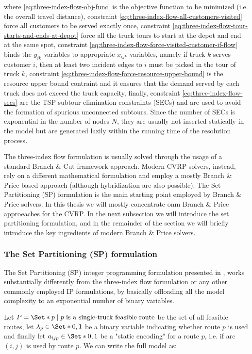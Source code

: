 where \ref{eq:three-index-flow-obj-func} is the objective function to be minimized (i.e. the overall travel distance),
constraint \ref{eq:three-index-flow-all-customers-visited} force all customers to be served exactly once,
constraint \ref{eq:three-index-flow-tour-starts-and-ends-at-depot} force all the truck tours to start at the depot and end at the same spot,
constraint \ref{eq:three-index-flow-force-visited-customer-if-flow} binds the $y_{ik}$ variables to appropriate $x_{ijk}$ variables,
namely if truck $k$ serves customer $i$, then at least two incident edges to $i$ must be picked in the tour of truck $k$,
constraint \ref{eq:three-index-flow-force-resource-upper-bound} is the resource upper bound contraint and it ensures that the demand served by each truck does not exceed the truck capacity,
finally, constraint \ref{eq:three-index-flow-secs} are the TSP subtour elimination constraints (SECs) and are used to avoid the formation of spurious unconnected subtours.
Since the number of SECs is exponential in the number of nodes $N$, they are usually not inserted statically in the model but are generated lazily within the running time of the resolution process.

The three-index flow formulation is usually solved through the usage of a standard Branch \& Cut framework approach.
Modern CVRP solvers, instead, rely on a different mathematical formulation and employ a  mostly Branch \& Price based-approach (although hybridization are also possible).
The Set Partitioning (SP) formulation is the main starting point employed by Branch \& Price solvers.
In this thesis we will mostly concentrate onm Branch \& Price approeaches for the CVRP.
In the next subsection we will introduce the set partitioning formulation, and in the remainder of the section
we will briefly introduce the key ingredients of modern Branch \& Price solvers.

\subsubsection{The Set Partitioning (SP) formulation}
The Set Partitioning (SP) integer programming formulation presented in \textcite{balinski1964integer},
works substantially differently from the three-index flow formulation or any other commonly employed
IP formulations, by basically offloading all the model complexity to an exponential number of binary variables.

Let $P = \Set*{p \mid p\ \text{is a single-truck feasible route}}$ be the set of all feasible routes,
let $\lambda_p \in \Set*{0, 1}$ be a binary variable indicating whether route $p$ is used
and finally let $a_{ijp} \in \Set*{0, 1}$ be a "static encoding" for a route $p$, i.e. if arc $(i, j)$ is used by route $p$.
We can write the full model as:


